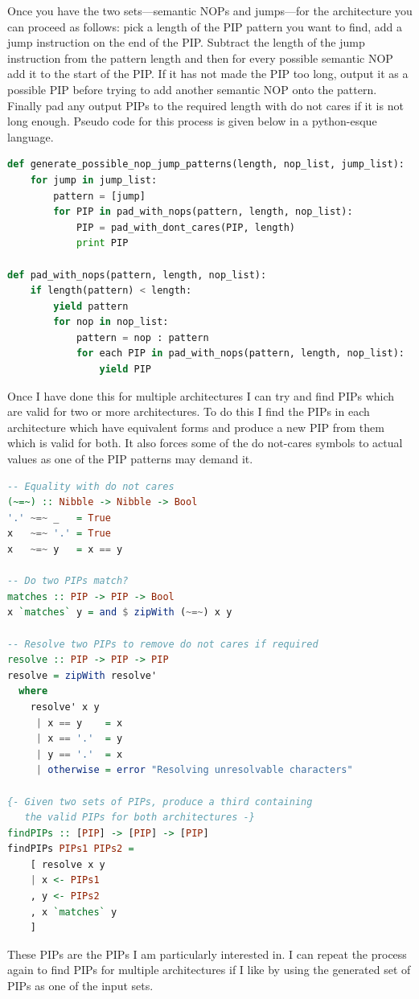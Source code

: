 \documentclass[10pt,]{book}
\begin{document}
Once you have the two sets---semantic NOPs and jumps---for the
architecture you can proceed as follows: pick a length of the PIP
pattern you want to find, add a jump instruction on the end of the PIP.
Subtract the length of the jump instruction from the pattern length and
then for every possible semantic NOP add it to the start of the PIP. If
it has not made the PIP too long, output it as a possible PIP before
trying to add another semantic NOP onto the pattern. Finally pad any
output PIPs to the required length with do not cares if it is not long
enough. Pseudo code for this process is given below in a python-esque
language.

\begin{lstlisting}[language=python ,
caption=Algorithm used to generate PIPs]
def generate_possible_nop_jump_patterns(length, nop_list, jump_list):
    for jump in jump_list:
        pattern = [jump]
        for PIP in pad_with_nops(pattern, length, nop_list):
            PIP = pad_with_dont_cares(PIP, length)
            print PIP

def pad_with_nops(pattern, length, nop_list):
    if length(pattern) < length:
        yield pattern
        for nop in nop_list:
            pattern = nop : pattern
            for each PIP in pad_with_nops(pattern, length, nop_list):
                yield PIP           
\end{lstlisting}
Once I have done this for multiple architectures I can try and find PIPs
which are valid for two or more architectures. To do this I find the
PIPs in each architecture which have equivalent forms and produce a new
PIP from them which is valid for both. It also forces some of the do
not-cares symbols to actual values as one of the PIP patterns may demand
it.

\begin{lstlisting}[language=haskell ,
caption=Method used for removing \emph{do not-cares} from potential PIP headers]
-- Equality with do not cares
(~=~) :: Nibble -> Nibble -> Bool
'.' ~=~ _   = True
x   ~=~ '.' = True
x   ~=~ y   = x == y

-- Do two PIPs match?
matches :: PIP -> PIP -> Bool
x `matches` y = and $ zipWith (~=~) x y

-- Resolve two PIPs to remove do not cares if required
resolve :: PIP -> PIP -> PIP
resolve = zipWith resolve'
  where
    resolve' x y
     | x == y    = x
     | x == '.'  = y
     | y == '.'  = x
     | otherwise = error "Resolving unresolvable characters"

{- Given two sets of PIPs, produce a third containing 
   the valid PIPs for both architectures -}
findPIPs :: [PIP] -> [PIP] -> [PIP]
findPIPs PIPs1 PIPs2 = 
    [ resolve x y
    | x <- PIPs1                            
    , y <- PIPs2                                      
    , x `matches` y
    ]
\end{lstlisting}
These PIPs are the PIPs I am particularly interested in. I can repeat
the process again to find PIPs for multiple architectures if I like by
using the generated set of PIPs as one of the input sets.
\end{document}
